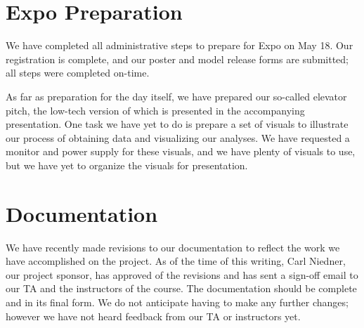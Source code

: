 \documentclass[onecolumn, draftclsnofoot,10pt, compsoc]{IEEEtran}
\begin{document}
\section{Expo Preparation} \label{expo}
\begin{singlespace}
We have completed all administrative steps to prepare for Expo on May 18.
Our registration is complete, and our poster and model release forms are submitted; all steps were completed on-time.

As far as preparation for the day itself, we have prepared our so-called elevator pitch, the low-tech version of which is presented in the accompanying presentation. 
One task we have yet to do is prepare a set of visuals to illustrate our process of obtaining data and visualizing our analyses.
We have requested a monitor and power supply for these visuals, and we have plenty of visuals to use, but we have yet to organize the visuals for presentation.
\end{singlespace}

\section{Documentation} \label{docs}
\begin{singlespace}
We have recently made revisions to our documentation to reflect the work we have accomplished on the project. As of the time of this writing, Carl Niedner, our project sponsor, has approved of the revisions and has sent a sign-off email to our TA and the instructors of the course. The documentation should be complete and in its final form. We do not anticipate having to make any further changes; however we have not heard feedback from our TA or instructors yet.
\end{singlespace}
\end{document}
